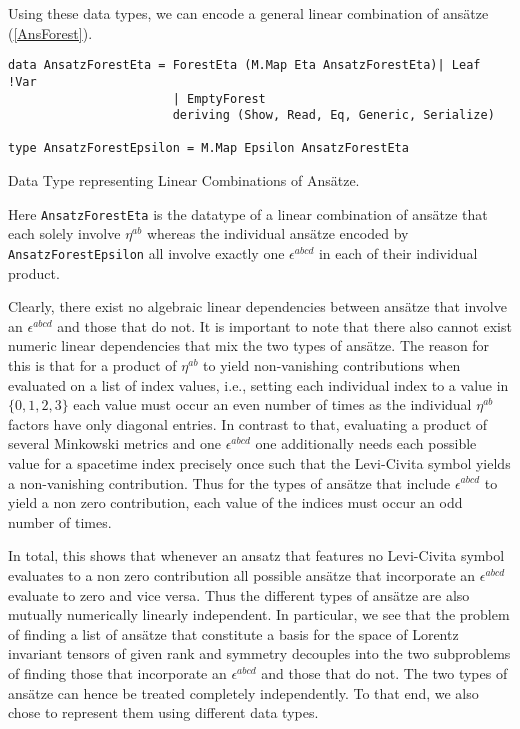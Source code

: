 Using these data types, we can encode a general linear combination of ansätze (\ref{AnsForest}).
\begin{listing}[hbt!] 
\begin{verbatim}
data AnsatzForestEta = ForestEta (M.Map Eta AnsatzForestEta)| Leaf !Var
                       | EmptyForest 
                       deriving (Show, Read, Eq, Generic, Serialize)

type AnsatzForestEpsilon = M.Map Epsilon AnsatzForestEta
\end{verbatim} 
\caption{Data Type representing Linear Combinations of Ansätze.}\label{AnsForest}
\end{listing}
Here \texttt{AnsatzForestEta} is the datatype of a linear combination of ansätze that each solely involve $\eta^{ab}$ whereas the individual ansätze encoded by \texttt{AnsatzForestEpsilon} all involve exactly one $\epsilon^{abcd}$ in each of their individual product.

Clearly, there exist no algebraic linear dependencies between ansätze that involve an $\epsilon^{abcd}$ and those that do not. 
It is important to note that there also cannot exist numeric linear dependencies that mix the two types of ansätze. The reason for this is that for a product of $\eta^{ab}$ to yield non-vanishing contributions when evaluated on a list of index values, i.e., setting each individual index to a value in $\{0,1,2,3 \}$ each value must occur an even number of times as the individual $\eta^{ab}$ factors have only diagonal entries. In contrast to that, evaluating a product of several Minkowski metrics and one $\epsilon^{abcd}$ one additionally needs each possible value for a spacetime index precisely once such that the Levi-Civita symbol yields a non-vanishing contribution. Thus for the types of ansätze that include $\epsilon^{abcd}$ to yield a non zero contribution, each value of the indices must occur an odd number of times.

In total, this shows that whenever an ansatz that features no Levi-Civita symbol evaluates to a non zero contribution all possible ansätze that incorporate an $\epsilon^{abcd}$ evaluate to zero and vice versa. Thus the different types of ansätze are also mutually numerically linearly independent. In particular, we see that the problem of finding a list of ansätze that constitute a basis for the space of Lorentz invariant tensors of given rank and symmetry decouples into the two subproblems of finding those that incorporate an $\epsilon^{abcd}$ and those that do not. The two types of ansätze can hence be treated completely independently. To that end, we also chose to represent them using different data types. 

